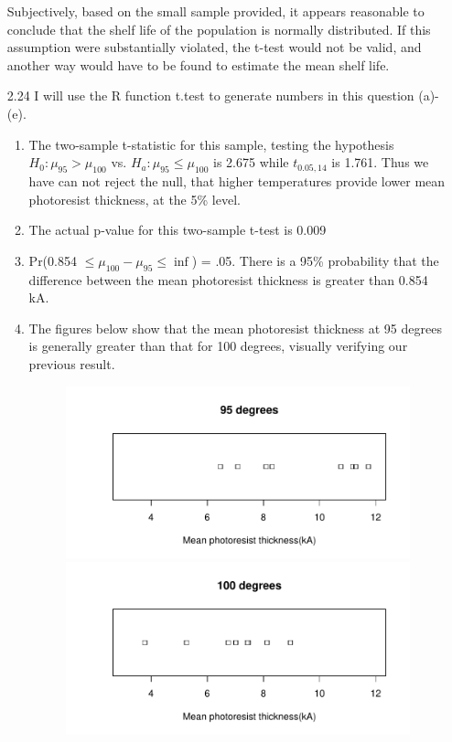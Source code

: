 \documentclass{article}
\begin{document}
\begin{enumerate}
            Subjectively, based on the small sample provided, it appears reasonable to conclude that the shelf life of the population is normally distributed. If this assumption were substantially violated, the t-test would not be valid, and another way would have to be found to estimate the mean shelf life. 
  \item[2.24] I will use the R function t.test to generate numbers in this question (a)-(e).
    \begin{enumerate}
      \item The two-sample t-statistic for this sample, testing the hypothesis $H_0: \mu_{95} > \mu_{100}$ vs. $H_a:\mu_{95} \le \mu_{100}$ is 2.675 while $t_{0.05,14}$ is 1.761. Thus we have can not reject the null, that higher temperatures provide lower mean photoresist thickness, at the 5\% level.
      \item The actual p-value for this two-sample t-test is 0.009
      \item Pr(0.854 $\le \mu_{100}-\mu_{95} \le \inf$) = .05. There is a 95\% probability that the difference between the mean photoresist thickness is greater than 0.854 kA.
      \item The figures below show that the mean photoresist thickness at 95 degrees is generally greater than that for 100 degrees, visually verifying our previous result. 
              \begin{figure}[h]
          \begin{center}
\includegraphics{Homework1-004}
\includegraphics{Homework1-005}

\end{center}
\end{figure}
\end{enumerate}
\end{enumerate}
\end{document}
